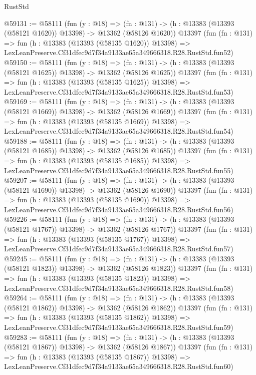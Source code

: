 \begin{lexlean}{RustStd}
\begin{coremodule}
@59131 := @58111
    (fun (y : @18) =>
    (fn : @131) -> (h : @13383 (@13393 (@58121 @1620)) @13398) -> @13362 (@58126 @1620))
    @13397
    (fun (fn : @131) =>
    fun (h : @13383 (@13393 (@58135 @1620)) @13398) =>
    LexLeanPreserve.Cf31dfec9d7f34a9133ae65a349666318.R28.RustStd.fun52)
@59150 := @58111
    (fun (y : @18) =>
    (fn : @131) -> (h : @13383 (@13393 (@58121 @1625)) @13398) -> @13362 (@58126 @1625))
    @13397
    (fun (fn : @131) =>
    fun (h : @13383 (@13393 (@58135 @1625)) @13398) =>
    LexLeanPreserve.Cf31dfec9d7f34a9133ae65a349666318.R28.RustStd.fun53)
@59169 := @58111
    (fun (y : @18) =>
    (fn : @131) -> (h : @13383 (@13393 (@58121 @1669)) @13398) -> @13362 (@58126 @1669))
    @13397
    (fun (fn : @131) =>
    fun (h : @13383 (@13393 (@58135 @1669)) @13398) =>
    LexLeanPreserve.Cf31dfec9d7f34a9133ae65a349666318.R28.RustStd.fun54)
@59188 := @58111
    (fun (y : @18) =>
    (fn : @131) -> (h : @13383 (@13393 (@58121 @1685)) @13398) -> @13362 (@58126 @1685))
    @13397
    (fun (fn : @131) =>
    fun (h : @13383 (@13393 (@58135 @1685)) @13398) =>
    LexLeanPreserve.Cf31dfec9d7f34a9133ae65a349666318.R28.RustStd.fun55)
@59207 := @58111
    (fun (y : @18) =>
    (fn : @131) -> (h : @13383 (@13393 (@58121 @1690)) @13398) -> @13362 (@58126 @1690))
    @13397
    (fun (fn : @131) =>
    fun (h : @13383 (@13393 (@58135 @1690)) @13398) =>
    LexLeanPreserve.Cf31dfec9d7f34a9133ae65a349666318.R28.RustStd.fun56)
@59226 := @58111
    (fun (y : @18) =>
    (fn : @131) -> (h : @13383 (@13393 (@58121 @1767)) @13398) -> @13362 (@58126 @1767))
    @13397
    (fun (fn : @131) =>
    fun (h : @13383 (@13393 (@58135 @1767)) @13398) =>
    LexLeanPreserve.Cf31dfec9d7f34a9133ae65a349666318.R28.RustStd.fun57)
@59245 := @58111
    (fun (y : @18) =>
    (fn : @131) -> (h : @13383 (@13393 (@58121 @1823)) @13398) -> @13362 (@58126 @1823))
    @13397
    (fun (fn : @131) =>
    fun (h : @13383 (@13393 (@58135 @1823)) @13398) =>
    LexLeanPreserve.Cf31dfec9d7f34a9133ae65a349666318.R28.RustStd.fun58)
@59264 := @58111
    (fun (y : @18) =>
    (fn : @131) -> (h : @13383 (@13393 (@58121 @1862)) @13398) -> @13362 (@58126 @1862))
    @13397
    (fun (fn : @131) =>
    fun (h : @13383 (@13393 (@58135 @1862)) @13398) =>
    LexLeanPreserve.Cf31dfec9d7f34a9133ae65a349666318.R28.RustStd.fun59)
@59283 := @58111
    (fun (y : @18) =>
    (fn : @131) -> (h : @13383 (@13393 (@58121 @1867)) @13398) -> @13362 (@58126 @1867))
    @13397
    (fun (fn : @131) =>
    fun (h : @13383 (@13393 (@58135 @1867)) @13398) =>
    LexLeanPreserve.Cf31dfec9d7f34a9133ae65a349666318.R28.RustStd.fun60)

\end{coremodule}
\end{lexlean}
